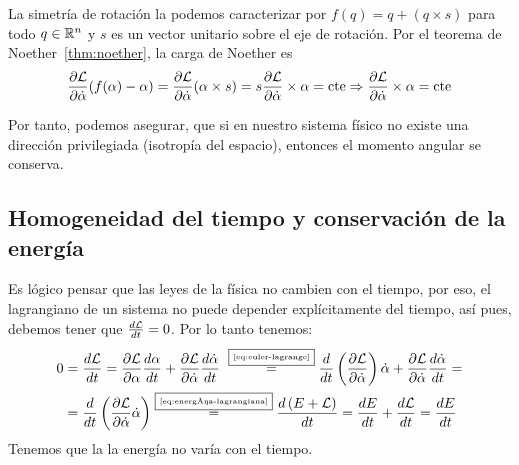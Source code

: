 La simetría de rotación la podemos caracterizar por $f(q)=q+(q\times s)$ para todo $q\in\mathbb{R}^n$ y $s$ es un vector unitario sobre el eje de rotación.
Por el teorema de Noether~\eqref{thm:noether}, la carga de Noether es
\begin{equation}
	\label{eq:conservacion_momento_angular}
	\frac{\partial \mathcal{L}}{\partial\dot{\alpha}}(f(\alpha)-\alpha) = \frac{\partial \mathcal{L}}{\partial\dot{\alpha}}(\alpha\times s) = s \frac{\partial \mathcal{L}}{\partial\dot{\alpha}}\times \alpha=\text{cte}\Rightarrow\frac{\partial \mathcal{L}}{\partial\dot{\alpha}}\times \alpha=\text{cte}
\end{equation}

Por tanto, podemos asegurar, que si en nuestro sistema físico no existe una dirección privilegiada (isotropía del espacio), entonces el momento angular se conserva.

\subsection{Homogeneidad del tiempo y conservación de la energía}\label{subsec:homogeneidad-del-tiempo-y-conservación-de-la-energía}



Es lógico pensar que las leyes de la física no cambien con el tiempo, por eso, el lagrangiano de un sistema no puede depender explícitamente del tiempo, así pues, debemos tener que $\frac{d\mathcal{L}}{dt}=0$.
Por lo tanto tenemos:
\begin{align*}
	0 & = \frac{d\mathcal{L}}{dt}=\frac{\partial \mathcal{L}}{\partial \alpha}\frac{d\alpha}{dt}+\frac{\partial \mathcal{L}}{\partial \dot{\alpha}}\frac{d\dot{\alpha}}{dt} ~\overset{\fbox{\tiny \ref{eq:euler-lagrange}}}{=} \frac{d}{dt}\left(\frac{\partial \mathcal{L}}{\partial \dot{\alpha}}\right)\dot{\alpha}+\frac{\partial \mathcal{L}}{\partial \dot{\alpha}}\frac{d\dot{\alpha}}{dt}=\\
	& = \frac{d}{dt}\left(\frac{\partial \mathcal{L}}{\partial \dot{\alpha}}\dot{\alpha}\right)\overset{\fbox{\tiny \ref{eq:energía-lagrangiana}}}{=}\frac{d\left(E+\mathcal{L}\right)}{dt}=\frac{d E}{dt}+\frac{d\mathcal{L}}{dt}=\frac{d E}{dt}
\end{align*}
Tenemos que la la energía no varía con el tiempo.
